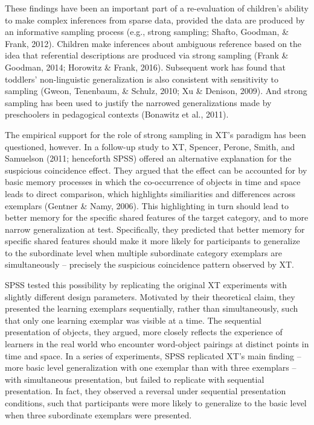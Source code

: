 \documentclass[english,floatsintext,man]{apa6}
\theoremstyle{definition}
\theoremstyle{definition}
\theoremstyle{definition}
\theoremstyle{remark}
\begin{document}
These findings have been an important part of a re-evaluation of
children's ability to make complex inferences from sparse data, provided
the data are produced by an informative sampling process (e.g., strong
sampling; Shafto, Goodman, \& Frank, 2012). Children make inferences
about ambiguous reference based on the idea that referential
descriptions are produced via strong sampling (Frank \& Goodman, 2014;
Horowitz \& Frank, 2016). Subsequent work has found that toddlers'
non-linguistic generalization is also consistent with sensitivity to
sampling (Gweon, Tenenbaum, \& Schulz, 2010; Xu \& Denison, 2009). And
strong sampling has been used to justify the narrowed generalizations
made by preschoolers in pedagogical contexts (Bonawitz et al., 2011).

The empirical support for the role of strong sampling in XT's paradigm
has been questioned, however. In a follow-up study to XT, Spencer,
Perone, Smith, and Samuelson (2011; henceforth SPSS) offered an
alternative explanation for the suspicious coincidence effect. They
argued that the effect can be accounted for by basic memory processes in
which the co-occurrence of objects in time and space leads to direct
comparison, which highlights similiarities and differences across
exemplars (Gentner \& Namy, 2006). This highlighting in turn should lead
to better memory for the specific shared features of the target
category, and to more narrow generalization at test. Specifically, they
predicted that better memory for specific shared features should make it
more likely for participants to generalize to the subordinate level when
multiple subordinate category exemplars are simultaneously -- precisely
the suspicious coincidence pattern observed by XT.

SPSS tested this possibility by replicating the original XT experiments
with slightly different design parameters. Motivated by their
theoretical claim, they presented the learning exemplars sequentially,
rather than simultaneously, such that only one learning exemplar was
visible at a time. The sequential presentation of objects, they argued,
more closely reflects the experience of learners in the real world who
encounter word-object pairings at distinct points in time and space. In
a series of experiments, SPSS replicated XT's main finding -- more basic
level generalization with one exemplar than with three exemplars -- with
simultaneous presentation, but failed to replicate with sequential
presentation. In fact, they observed a reversal under sequential
presentation conditions, such that participants were more likely to
generalize to the basic level when three subordinate exemplars were
presented.
\end{document}
